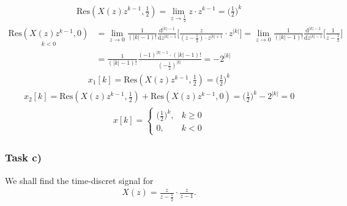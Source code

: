\begin{align}
	\mathrm{Res}(X(z)z^{k-1},\frac{1}{2})=\lim\limits_{z\rightarrow\frac{1}{2}}z\cdot z^{k-1}=\bigg (\frac{1}{2} \bigg)^k
\end{align}
\begin{align}
	\underset{k<0}{\mathrm{Res}(X(z)z^{k-1},0)}&=\lim\limits_{z\rightarrow0}\frac{1}{(|k|-1)!}\frac{\mathrm{d}^{|k|-1}}{\mathrm{d}z^{|k|-1}}\Bigg [\frac{z}{(z-\frac{1}{2})\cdot z^{|k|+1}}\cdot z^{|k|}\Bigg]=\lim\limits_{z\rightarrow0}\frac{1}{(|k|-1)!}\frac{\mathrm{d}^{|k|-1}}{\mathrm{d}z^{|k|-1}}\Bigg [\frac{1}{z-\frac{1}{2}}\Bigg]\nonumber\\
	&=\frac{1}{(|k|-1)!}\frac{(-1)^{|k|-1}\cdot (|k|-1)!}{(-\frac{1}{2})^{|k|}}=-2^{|k|}
\end{align}
\begin{align}
	x_1[k]=\mathrm{Res}(X(z)z^{k-1},\frac{1}{2})=\bigg( \frac{1}{2} \bigg )^k
\end{align}
\begin{align}
	x_2[k]=\mathrm{Res}(X(z)z^{k-1},\frac{1}{2})+\mathrm{Res}(X(z)z^{k-1},0)=\bigg ( \frac{1}{2} \bigg)^k-2^{|k|}=0
\end{align}
\begin{align}
	x[k]=
	\begin{cases}
		\bigg (\frac{1}{2} \bigg)^k, &k\geq0 \\
		0, &k<0
	\end{cases}
\end{align}
\subsubsection{Task c)}
We shall find the time-discret signal for 
\begin{align}
	X(z)=\frac{z}{z-\frac{1}{2}}\cdot\frac{z}{z-1}.
\end{align}

